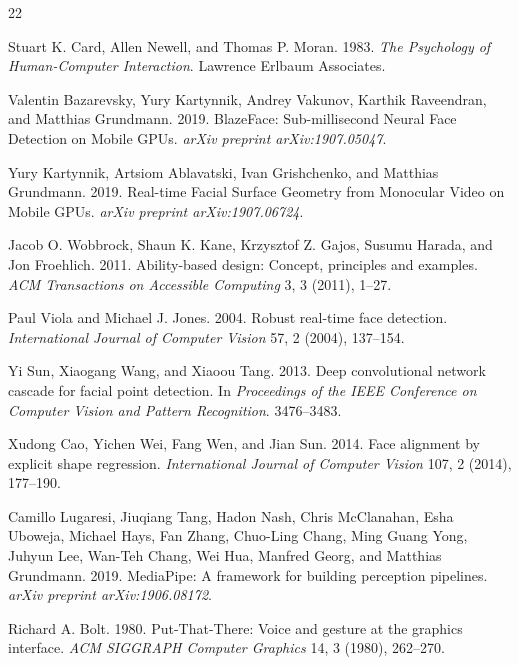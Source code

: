 \documentclass[sigconf]{acmart}
\begin{document}

\begin{thebibliography}{22}

Stuart K. Card, Allen Newell, and Thomas P. Moran. 1983.
\newblock \emph{The Psychology of Human-Computer Interaction}.
\newblock Lawrence Erlbaum Associates.

Valentin Bazarevsky, Yury Kartynnik, Andrey Vakunov, Karthik Raveendran, and Matthias Grundmann. 2019.
\newblock BlazeFace: Sub-millisecond Neural Face Detection on Mobile GPUs.
\newblock \emph{arXiv preprint arXiv:1907.05047}.

Yury Kartynnik, Artsiom Ablavatski, Ivan Grishchenko, and Matthias Grundmann. 2019.
\newblock Real-time Facial Surface Geometry from Monocular Video on Mobile GPUs.
\newblock \emph{arXiv preprint arXiv:1907.06724}.

Jacob O. Wobbrock, Shaun K. Kane, Krzysztof Z. Gajos, Susumu Harada, and Jon Froehlich. 2011.
\newblock Ability-based design: Concept, principles and examples.
\newblock \emph{ACM Transactions on Accessible Computing} 3, 3 (2011), 1--27.

Paul Viola and Michael J. Jones. 2004.
\newblock Robust real-time face detection.
\newblock \emph{International Journal of Computer Vision} 57, 2 (2004), 137--154.

Yi Sun, Xiaogang Wang, and Xiaoou Tang. 2013.
\newblock Deep convolutional network cascade for facial point detection.
\newblock In \emph{Proceedings of the IEEE Conference on Computer Vision and Pattern Recognition}. 3476--3483.

Xudong Cao, Yichen Wei, Fang Wen, and Jian Sun. 2014.
\newblock Face alignment by explicit shape regression.
\newblock \emph{International Journal of Computer Vision} 107, 2 (2014), 177--190.

Camillo Lugaresi, Jiuqiang Tang, Hadon Nash, Chris McClanahan, Esha Uboweja, Michael Hays, Fan Zhang, Chuo-Ling Chang, Ming Guang Yong, Juhyun Lee, Wan-Teh Chang, Wei Hua, Manfred Georg, and Matthias Grundmann. 2019.
\newblock MediaPipe: A framework for building perception pipelines.
\newblock \emph{arXiv preprint arXiv:1906.08172}.

Richard A. Bolt. 1980.
\newblock Put-That-There: Voice and gesture at the graphics interface.
\newblock \emph{ACM SIGGRAPH Computer Graphics} 14, 3 (1980), 262--270.


\end{thebibliography}
\end{document}
